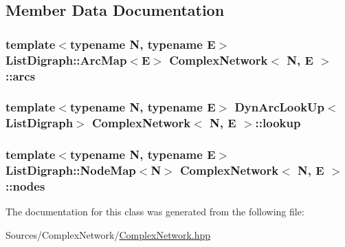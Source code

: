 \subsection{Member Data Documentation}
\hypertarget{class_complex_network_a5d466d263d5013364c264497a0c797a8}{
\subsubsection[{arcs}]{\setlength{\rightskip}{0pt plus 5cm}template$<$typename N, typename E$>$ List\+Digraph\+::\+Arc\+Map$<$E$>$ {\bf Complex\+Network}$<$ N, E $>$\+::arcs\hspace{0.3cm}{\ttfamily [protected]}}}\label{class_complex_network_a5d466d263d5013364c264497a0c797a8}
\hypertarget{class_complex_network_a15c45cf68f6d708af9ca46a1a155a115}{
\subsubsection[{lookup}]{\setlength{\rightskip}{0pt plus 5cm}template$<$typename N, typename E$>$ Dyn\+Arc\+Look\+Up$<$List\+Digraph$>$ {\bf Complex\+Network}$<$ N, E $>$\+::lookup\hspace{0.3cm}{\ttfamily [protected]}}}\label{class_complex_network_a15c45cf68f6d708af9ca46a1a155a115}
\hypertarget{class_complex_network_ab859f9614083b288b3353962c99681cd}{
\subsubsection[{nodes}]{\setlength{\rightskip}{0pt plus 5cm}template$<$typename N, typename E$>$ List\+Digraph\+::\+Node\+Map$<$N$>$ {\bf Complex\+Network}$<$ N, E $>$\+::nodes\hspace{0.3cm}{\ttfamily [protected]}}}\label{class_complex_network_ab859f9614083b288b3353962c99681cd}


The documentation for this class was generated from the following file\+:\begin{DoxyCompactItemize}
\item 
Sources/\+Complex\+Network/\hyperlink{_complex_network_8hpp}{Complex\+Network.\+hpp}\end{DoxyCompactItemize}

